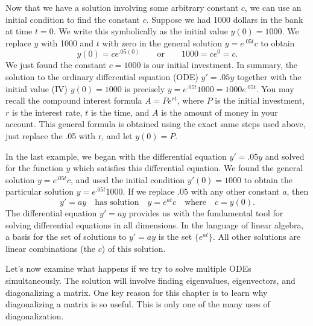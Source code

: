 \begin{example}
Now that we have a solution involving some arbitrary constant $c$, we can use an initial condition to find the constant $c$. 
Suppose we had 1000 dollars in the bank at time $t=0$.  We write this symbolically as the initial value $y(0)=1000$.
We replace $y$ with 1000 and $t$ with zero in the general solution $y = e^{.05 t}c$ to obtain 
$$y(0) =  c e^{.05 (0)}\quad\quad \text{or}\quad\quad 1000 = c e^0=c.$$ We just found the constant $c=1000$ is our initial investment. 
In summary, the solution to the ordinary differential equation (ODE) $y'=.05 y$ together with the initial value (IV) $y(0)=1000$ is precisely $y = e^{.05 t} 1000 = 1000 e^{.05 t}$. 
You may recall the compound interest formula $A=Pe^{rt}$, where $P$ is the initial investment, $r$ is the interest rate, $t$ is the time, and $A$ is the amount of money in your account. This general formula is obtained using the exact same steps used above, just replace the .05 with r, and let $y(0) = P$.
\end{example}


In the last example, we began with the differential equation $y'=.05 y$ and solved for the function $y$ which satisfies this differential equation. We found the general solution $y=e^{.05t}c$, and used the initial condition $y'(0) = 1000$ to obtain the particular solution $y=e^{.05t}1000$.   If we replace $.05$ with any other constant $a$, then
$$y'=ay \quad \text{has solution} \quad y=e^{at}c\quad \text{where}\quad c=y(0).$$ 
The differential equation $y' = a y$ provides us with the fundamental tool for solving differential equations in all dimensions.  
In the language of linear algebra, a basis for the set of solutions to $y'=ay$ is the set $\{e^{at}\}$. All other solutions are linear combinations (the $c$) of this solution.  

Let's now examine what happens if we try to solve multiple ODEs simultaneously. 
The solution will involve finding eigenvalues, eigenvectors, and diagonalizing a matrix. One key reason for this chapter is to learn why diagonalizing a matrix is so useful. This is only one of the many uses of diagonalization.

